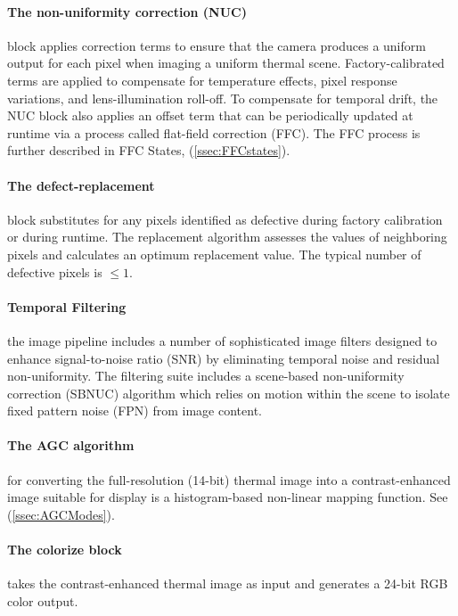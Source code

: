 \paragraph{The non-uniformity correction (NUC)} block applies correction
terms to ensure that the camera produces a uniform output for each pixel when
imaging a uniform thermal scene. Factory-calibrated terms are applied to
compensate for temperature effects, pixel response variations, and
lens-illumination roll-off. To compensate for temporal drift, the NUC block also
applies an offset term that can be periodically updated at runtime via a process
called flat-field correction (FFC). The FFC process is further described in FFC
States, (\ref{ssec:FFCstates}).
%
\paragraph{The defect-replacement} block substitutes for any pixels identified
as defective during factory calibration or during runtime. The replacement
algorithm assesses the values of neighboring pixels and calculates an optimum
replacement value. The typical number of defective pixels is $\leq 1$.
%
\paragraph{Temporal Filtering} the image pipeline includes a number of
sophisticated image filters designed to enhance signal-to-noise ratio (SNR) by
eliminating temporal noise and residual non-uniformity. The filtering suite
includes a scene-based non-uniformity correction (SBNUC) algorithm which relies
on motion within the scene to isolate fixed pattern noise (FPN) from image
content.
%
\paragraph{The AGC algorithm} for converting the full-resolution (14-bit)
thermal image into a contrast-enhanced image suitable for display is a
histogram-based non-linear mapping function. See (\ref{ssec:AGCModes}).
%
\paragraph{The colorize block} takes the contrast-enhanced thermal image as
input and generates a 24-bit RGB color output.
%
